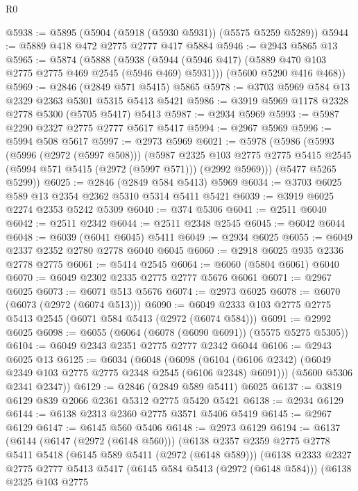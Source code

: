 \begin{lexlean}{R0}
\begin{coremodule}
@5938 := @5895 (@5904 (@5918 (@5930 @5931)) (@5575 @5259 @5289))
@5944 := @5889 @418 @472 @2775 @2777 @417 @5884
@5946 := @2943 @5865 @13
@5965 := @5874
    (@5888
      (@5938 (@5944 (@5946 @417) (@5889 @470 @103 @2775 @2775 @469 @2545 (@5946 @469) @5931)))
      (@5600 @5290 @416 @468))
@5969 := @2846 (@2849 @571 @5415) @5865
@5978 := @3703 @5969 @584 @13 @2329 @2363 @5301 @5315 @5413 @5421
@5986 := @3919 @5969 @1178 @2328 @2778 @5300 (@5705 @5417) @5413
@5987 := @2934 @5969
@5993 := @5987 @2290 @2327 @2775 @2777 @5617 @5417
@5994 := @2967 @5969
@5996 := @5994 @508 @5617
@5997 := @2973 @5969
@6021 := @5978
    (@5986
      (@5993
        (@5996 (@2972 (@5997 @508)))
        (@5987
          @2325
          @103
          @2775
          @2775
          @5415
          @2545
          (@5994 @571 @5415 (@2972 (@5997 @571)))
          (@2992 @5969)))
      (@5477 @5265 @5299))
@6025 := @2846 (@2849 @584 @5413) @5969
@6034 := @3703 @6025 @589 @13 @2354 @2362 @5310 @5314 @5411 @5421
@6039 := @3919 @6025 @2274 @2353 @5242 @5309
@6040 := @374 @5306
@6041 := @2511 @6040
@6042 := @2511 @2342
@6044 := @2511 @2348 @2545
@6045 := @6042 @6044
@6048 := @6039 (@6041 @6045) @5411
@6049 := @2934 @6025
@6055 := @6049 @2337 @2352 @2780 @2778 @6040 @6045
@6060 := @2918 @6025 @935 @2336 @2778 @2775
@6061 := @5414 @2545
@6064 := @6060 (@5804 @6061) @6040
@6070 := @6049 @2302 @2335 @2775 @2777 @5676 @6061
@6071 := @2967 @6025
@6073 := @6071 @513 @5676
@6074 := @2973 @6025
@6078 := @6070 (@6073 (@2972 (@6074 @513)))
@6090 := @6049 @2333 @103 @2775 @2775 @5413 @2545 (@6071 @584 @5413 (@2972 (@6074 @584)))
@6091 := @2992 @6025
@6098 := @6055 (@6064 (@6078 (@6090 @6091)) (@5575 @5275 @5305))
@6104 := @6049 @2343 @2351 @2775 @2777 @2342 @6044
@6106 := @2943 @6025 @13
@6125 := @6034
    (@6048
      (@6098 (@6104 (@6106 @2342) (@6049 @2349 @103 @2775 @2775 @2348 @2545 (@6106 @2348) @6091)))
      (@5600 @5306 @2341 @2347))
@6129 := @2846 (@2849 @589 @5411) @6025
@6137 := @3819 @6129 @839 @2066 @2361 @5312 @2775 @5420 @5421
@6138 := @2934 @6129
@6144 := @6138 @2313 @2360 @2775 @3571 @5406 @5419
@6145 := @2967 @6129
@6147 := @6145 @560 @5406
@6148 := @2973 @6129
@6194 := @6137
    (@6144
      (@6147 (@2972 (@6148 @560)))
      (@6138
        @2357
        @2359
        @2775
        @2778
        @5411
        @5418
        (@6145 @589 @5411 (@2972 (@6148 @589)))
        (@6138
          @2333
          @2327
          @2775
          @2777
          @5413
          @5417
          (@6145 @584 @5413 (@2972 (@6148 @584)))
          (@6138
            @2325
            @103
            @2775

\end{coremodule}
\end{lexlean}
